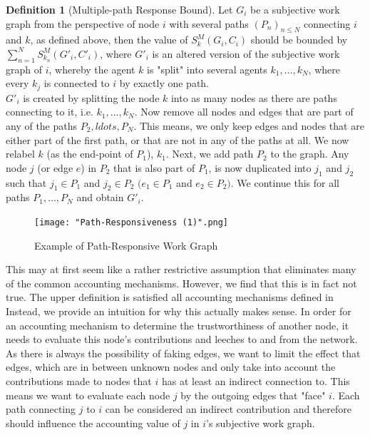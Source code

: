\documentclass[11pt,a4paper]{article}
\theoremstyle{definition}
\newtheorem{definition}{Definition}[section]
\theoremstyle{theorem}
\theoremstyle{proposition}
\theoremstyle{corollary}
\theoremstyle{lemma}
\theoremstyle{example}
\theoremstyle{remark}
\begin{document}
\begin{definition}[Multiple-path Response Bound]
Let $G_i$ be a subjective work graph from the perspective of node $i$ with several paths $(P_n)_{n\leq{}N}$ connecting $i$ and $k$, as defined above, then the value of $S^M_k(G_i,C_i)$ should be bounded by $\sum\limits_{n=1}^{N}S^M_{k_n}(G'_i,C'_i)$, where $G'_i$ is an altered version of the subjective work graph of $i$, whereby the agent $k$ is "split" into several agents $k_{1},\ldots,k_{N}$, where every $k_j$ is connected to $i$ by exactly one path. \vspace{1em}\\

\noindent{}$G'_i$ is created by splitting the node $k$ into as many nodes as there are paths connecting to it, i.e. $k_1,\ldots,k_N$. Now remove all nodes and edges that are part of any of the paths $P_2,ldots,P_N$. This means, we only keep edges and nodes that are either part of the first path, or that are not in any of the paths at all. We now relabel $k$ (as the end-point of $P_1$), $k_1$. Next, we add path $P_2$ to the graph. Any node $j$ (or edge $e$) in $P_2$ that is also part of $P_1$, is now duplicated into $j_1$ and $j_2$ such that $j_1\in{}P_1$ and $j_2\in{}P_2$ $(e_1\in{}P_1$ and $e_2\in{}P_2)$. We continue this for all paths $P_1,\ldots,P_N$ and obtain $G'_i$. 
\end{definition}

\begin{figure}[H]
\begin{center}
\texttt{[image: "Path-Responsiveness (1)".png]}
\caption{Example of Path-Responsive Work Graph}
\label{fig:Example of Path-Responsive Work Graph}
\end{center}
\end{figure}

\noindent{}This may at first seem like a rather restrictive assumption that eliminates many of the common accounting mechanisms. However, we find that this is in fact not true. The upper definition is satisfied all accounting mechanisms defined in \cite{Hybrid Transitive Trust Mechanisms} Instead, we provide an intuition for why this actually makes sense. In order for an accounting mechanism to determine the trustworthiness of another node, it needs to evaluate this node's contributions and leeches to and from the network. As there is always the possibility of faking edges, we want to limit the effect that edges, which are in between unknown nodes and only take into account the contributions made to nodes that $i$ has at least an indirect connection to. This means we want to evaluate each node $j$ by the outgoing edges that "face" $i$. Each path connecting $j$ to $i$ can be considered an indirect contribution and therefore should influence the accounting value of $j$ in $i$'s subjective work graph. \vspace{1em}\\
\end{document}
